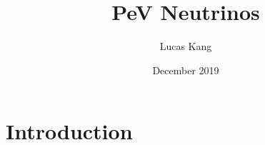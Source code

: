 \documentclass{article}
\title{PeV Neutrinos}
\author{Lucas Kang}
\date{December 2019}
\begin{document}
\maketitle

\section{Introduction}
\end{document}
